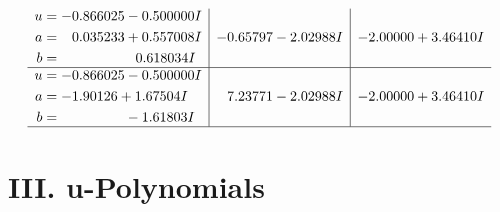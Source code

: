 \documentclass[1p]{elsarticle_modified}
\theoremstyle{definition}
\begin{document}
$$\begin{array}{c|c|c}
\begin{aligned}
u &= -0.866025 - 0.500000 I \\
a &= \phantom{-}0.035233 + 0.557008 I \\
b &= \phantom{-0.000000 -}0.618034 I\end{aligned}
 & -0.65797 - 2.02988 I & -2.00000 + 3.46410 I \\ \hline\begin{aligned}
u &= -0.866025 - 0.500000 I \\
a &= -1.90126 + 1.67504 I \\
b &= \phantom{-0.000000 } -1.61803 I\end{aligned}
 & \phantom{-}7.23771 - 2.02988 I & -2.00000 + 3.46410 I\\
 \hline 
 \end{array}$$\newpage
\newpage\renewcommand{\arraystretch}{1}
\centering \section*{ III. u-Polynomials}
\end{document}
